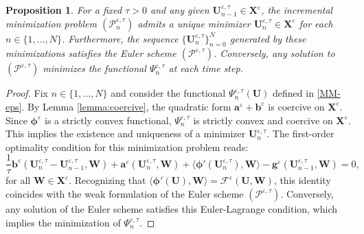 \documentclass[a4paper,11pt]{article}
\newtheorem{proposition}[theorem]{Proposition}
\theoremstyle{definition}
\numberwithin{equation}{section}
\newcommand{\e}{\varepsilon}
\begin{document}
\begin{proposition}
	For a fixed $\tau > 0$ and any given $\mathbf{U}_{n-1}^{\e,\tau} \in \mathbf{X}^\e$, the incremental minimization problem $(\mathcal{P}_n^{\e,\tau})$ admits a unique minimizer $\mathbf{U}_n^{\e,\tau} \in \mathbf{X}^\e$ for each $n \in \{ 1, \dots, N \}$. Furthermore, the sequence $\{\mathbf{U}_n^{\e,\tau}\}_{n=0}^N$ generated by these minimizations satisfies the Euler scheme $(\mathcal{P}^{\e,\tau})$. Conversely, any solution to $(\mathcal{P}^{\e,\tau})$ minimizes the functional $\Psi_n^{\e,\tau}$ at each time step.
\end{proposition}
\begin{proof} 
	Fix $n \in \{ 1, \dots, N \}$ and consider the functional $\Psi_n^{\e,\tau}(\mathbf{U})$ defined in \eqref{MM-eps}. By Lemma \ref{lemma:coercive}, the quadratic form $\mathbf{a}^\e + \mathbf{b}^\e$ is coercive on $\mathbf{X}^\e$. Since $\mathbf{\phi}^\e$ is a strictly convex functional, $\Psi_n^{\e,\tau}$ is strictly convex and coercive on $\mathbf{X}^\e$. This implies the existence and uniqueness of a minimizer $\mathbf{U}_n^{\e,\tau}$. The first-order optimality condition for this minimization problem reads:
	\[
	\frac{1}{\tau} \mathbf{b}^\e(\mathbf{U}_n^{\e,\tau} - \mathbf{U}_{n-1}^{\e,\tau}, \mathbf{W}) 
	+ \mathbf{a}^\e(\mathbf{U}_n^{\e,\tau}, \mathbf{W}) 
	+ \langle \mathbf{\phi}'(\mathbf{U}_n^{\e,\tau}), \mathbf{W} \rangle - \mathbf{g}^\e(\mathbf{U}_{n-1}^{\e,\tau}, \mathbf{W}) = 0,
	\]
	for all $\mathbf{W} \in \mathbf{X}^\e$. Recognizing that $\langle \mathbf{\phi}'(\mathbf{U}), \mathbf{W} \rangle = \mathcal{F}^\e(\mathbf{U}, \mathbf{W})$, this identity coincides with the weak formulation of the Euler scheme $(\mathcal{P}^{\e,\tau})$. Conversely, any solution of the Euler scheme satisfies this Euler-Lagrange condition, which implies the minimization of $\Psi_n^{\e,\tau}$.
\end{proof}
\end{document}
